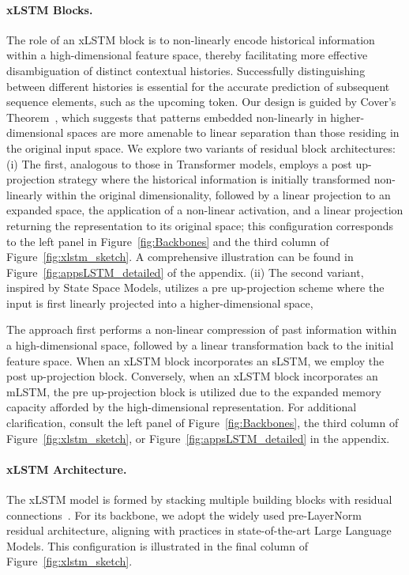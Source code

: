 \paragraph{xLSTM Blocks.}
\label{sec:xLSTMblock}
The role of an xLSTM block is to non-linearly encode historical information within a high-dimensional feature space, thereby facilitating more effective disambiguation of distinct contextual histories. Successfully distinguishing between different histories is essential for the accurate prediction of subsequent sequence elements, such as the upcoming token. Our design is guided by Cover’s Theorem~\citep{Cover:65}, which suggests that patterns embedded non-linearly in higher-dimensional spaces are more amenable to linear separation than those residing in the original input space. We explore two variants of residual block architectures: (i) The first, analogous to those in Transformer models, employs a post up-projection strategy where the historical information is initially transformed non-linearly within the original dimensionality, followed by a linear projection to an expanded space, the application of a non-linear activation, and a linear projection returning the representation to its original space; this configuration corresponds to the left panel in Figure~\ref{fig:Backbones} and the third column of Figure~\ref{fig:xlstm_sketch}. A comprehensive illustration can be found in Figure~\ref{fig:appsLSTM_detailed} of the appendix. (ii) The second variant, inspired by State Space Models, utilizes a pre up-projection scheme where the input is first linearly projected into a higher-dimensional space,

The approach first performs a non-linear compression of past information within a high-dimensional space, followed by a linear transformation back to the initial feature space. When an xLSTM block incorporates an sLSTM, we employ the post up-projection block. Conversely, when an xLSTM block incorporates an mLSTM, the pre up-projection block is utilized due to the expanded memory capacity afforded by the high-dimensional representation. For additional clarification, consult the left panel of Figure~\ref{fig:Backbones}, the third column of Figure~\ref{fig:xlstm_sketch}, or Figure~\ref{fig:appsLSTM_detailed} in the appendix.

\paragraph{xLSTM Architecture. }
\label{sec:xLSTMarchitecure}
The xLSTM model is formed by stacking multiple building blocks with residual connections~\citep{Srivastava:15,He:16}. For its backbone, we adopt the widely used pre-LayerNorm~\citep{Ba:16b} residual architecture, aligning with practices in state-of-the-art Large Language Models. This configuration is illustrated in the final column of Figure~\ref{fig:xlstm_sketch}.

